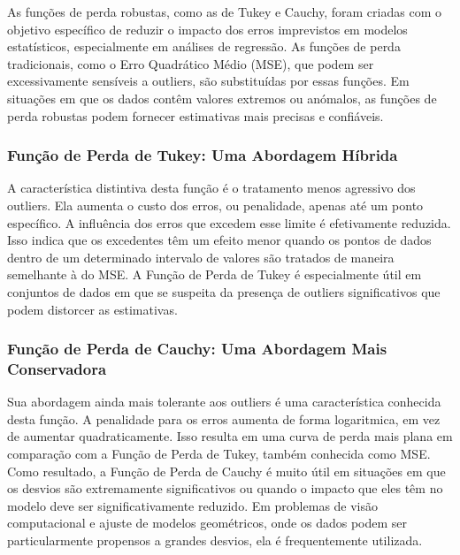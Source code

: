 \documentclass{article}
\begin{document}
As funções de perda robustas, como as de Tukey e Cauchy, foram criadas com o objetivo específico de reduzir o impacto dos erros imprevistos em modelos estatísticos, especialmente em análises de regressão. As funções de perda tradicionais, como o Erro Quadrático Médio (MSE), que podem ser excessivamente sensíveis a outliers, são substituídas por essas funções. Em situações em que os dados contêm valores extremos ou anómalos, as funções de perda robustas podem fornecer estimativas mais precisas e confiáveis.

\subsubsection{Função de Perda de Tukey: Uma Abordagem Híbrida}

A característica distintiva desta função é o tratamento menos agressivo dos outliers. Ela aumenta o custo dos erros, ou penalidade, apenas até um ponto específico. A influência dos erros que excedem esse limite é efetivamente reduzida. Isso indica que os excedentes têm um efeito menor quando os pontos de dados dentro de um determinado intervalo de valores são tratados de maneira semelhante à do MSE. A Função de Perda de Tukey é especialmente útil em conjuntos de dados em que se suspeita da presença de outliers significativos que podem distorcer as estimativas.

\subsubsection{Função de Perda de Cauchy: Uma Abordagem Mais Conservadora}

Sua abordagem ainda mais tolerante aos outliers é uma característica conhecida desta função. A penalidade para os erros aumenta de forma logaritmica, em vez de aumentar quadraticamente. Isso resulta em uma curva de perda mais plana em comparação com a Função de Perda de Tukey, também conhecida como MSE. Como resultado, a Função de Perda de Cauchy é muito útil em situações em que os desvios são extremamente significativos ou quando o impacto que eles têm no modelo deve ser significativamente reduzido. Em problemas de visão computacional e ajuste de modelos geométricos, onde os dados podem ser particularmente propensos a grandes desvios, ela é frequentemente utilizada.
\end{document}
